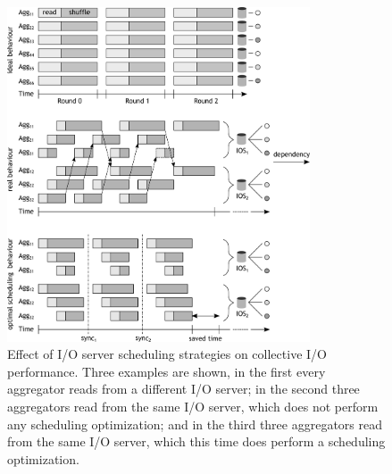 \begin{figure}[!htb]
  \centering
  \includegraphics[width=0.8\textwidth]{figures/network-concur}
  \caption{Effect of I/O server scheduling strategies on collective I/O performance. Three examples are shown, in the first every aggregator reads from a different I/O server; in the second three aggregators
  read from the same I/O server, which does not perform any scheduling optimization; and in the third three aggregators read from the same I/O server, which this time does perform a scheduling optimization.}
  \label{figure: network-concur}
\end{figure}

